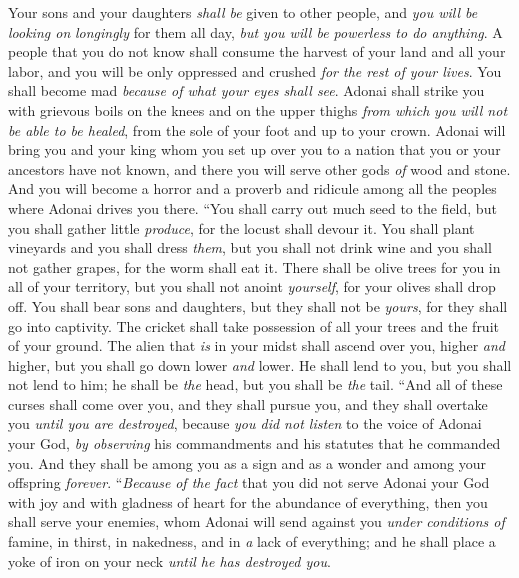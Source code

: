 \begin{biblechapter}
\verse Your sons and your daughters \textit{shall be} given to other people, and \textit{you will be looking on} \textit{longingly} for them all day, \textit{but you will be powerless to do anything}.
\verse A people that you do not know shall consume the harvest of your land and all your labor, and you will be only oppressed and crushed \textit{for the rest of your lives}.
\verse You shall become mad \textit{because of what your eyes shall see}.
\verse Adonai shall strike you with grievous boils on the knees and on the upper thighs \textit{from which} \textit{you will not be able to be healed}, from the sole of your foot and up to your crown.
\verse Adonai will bring you and your king whom you set up over you to a nation that you or your ancestors have not known, and there you will serve other gods \textit{of} wood and stone.
\verse And you will become a horror and a proverb and ridicule among all the peoples where Adonai drives you there.
\verse “You shall carry out much seed to the field, but you shall gather little \textit{produce}, for the locust shall devour it.
\verse You shall plant vineyards and you shall dress \textit{them}, but you shall not drink wine and you shall not gather grapes, for the worm shall eat it.
\verse There shall be olive trees for you in all of your territory, but you shall not anoint \textit{yourself}, for your olives shall drop off.
\verse You shall bear sons and daughters, but they shall not be \textit{yours}, for they shall go into captivity.
\verse The cricket shall take possession of all your trees and the fruit of your ground.
\verse The alien that \textit{is} in your midst shall ascend over you, higher \textit{and} higher, but you shall go down lower \textit{and} lower.
\verse He shall lend to you, but you shall not lend to him; he shall be \textit{the} head, but you shall be \textit{the} tail.
\verse “And all of these curses shall come over you, and they shall pursue you, and they shall overtake you \textit{until you are destroyed}, because \textit{you did not listen} to the voice of Adonai your God, \textit{by observing} his commandments and his statutes that he commanded you.
\verse And they shall be among you as a sign and as a wonder and among your offspring \textit{forever}.
\verse “\textit{Because} \textit{of the fact} that you did not serve Adonai your God with joy and with gladness of heart for the abundance of everything,
\verse then you shall serve your enemies, whom Adonai will send against you \textit{under conditions of} famine, in thirst, in nakedness, and in \textit{a} lack of everything; and he shall place a yoke of iron on your neck \textit{until he has destroyed you}.

\end{biblechapter}
